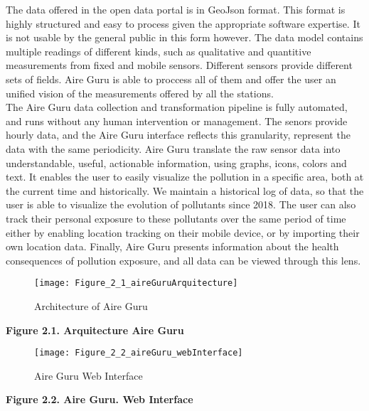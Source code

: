 The data offered in the open data portal is in GeoJson format.
This format is highly structured and easy to process given the appropriate software expertise. It is not usable by the general public in this form however.
The data model contains multiple readings of different kinds, such as qualitative and quantitive measurements from fixed and mobile sensors.
Different sensors provide different sets of fields.
Aire Guru is able to proccess all of them and offer the user an unified vision of the measurements offered by all the stations.\\

The Aire Guru data collection and transformation pipeline is fully automated, and runs without any human intervention or management.
The senors provide hourly data, and the Aire Guru interface reflects this granularity, represent the data with the same periodicity.
Aire Guru translate the raw sensor data into understandable, useful, actionable information, using graphs, icons, colors and text. 
It enables the user to easily visualize the pollution in a specific area, both at the current time and historically. We maintain
a historical log of data, so that the user is able to visualize the evolution of pollutants since 2018. The user can also track their personal exposure
to these pollutants over the same period of time either by enabling location tracking on their mobile device, or by importing their own location
data. Finally, Aire Guru presents information about the health consequences of pollution exposure, and all data can be viewed through this lens.\\

\begin{figure}[ht]
    \centering
    \texttt{[image: Figure\_2\_1\_aireGuruArquitecture]}
    \caption{Architecture of Aire Guru}
\end{figure}

\begin{center}
    \bf Figure 2.1. Arquitecture Aire Guru\\
\end{center}

\begin{figure}[ht]
    \centering
    \texttt{[image: Figure\_2\_2\_aireGuru\_webInterface]}
    \caption{Aire Guru Web Interface}
\end{figure}

\begin{center}
    \bf Figure 2.2. Aire Guru. Web Interface\\
\end{center}

